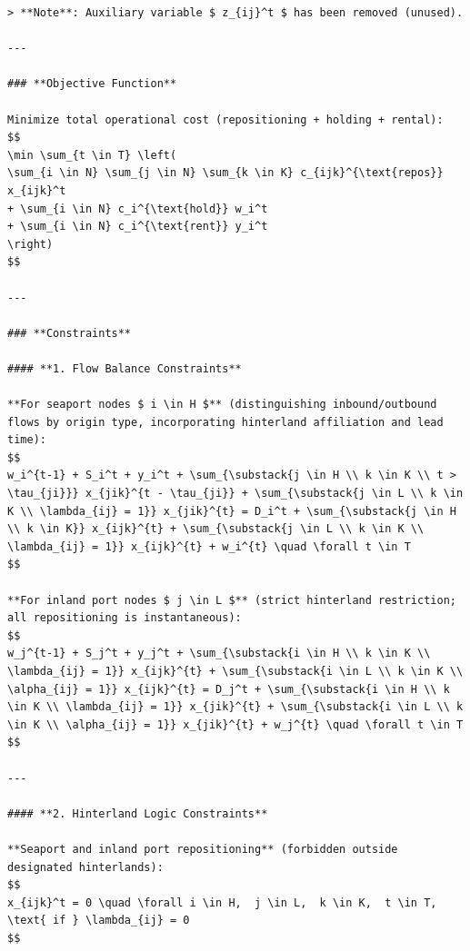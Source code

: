 \documentclass[preprint,12pt]{elsarticle}
\begin{document}
\begin{lstlisting}
> **Note**: Auxiliary variable $ z_{ij}^t $ has been removed (unused).

---

### **Objective Function**

Minimize total operational cost (repositioning + holding + rental):
$$
\min \sum_{t \in T} \left(
\sum_{i \in N} \sum_{j \in N} \sum_{k \in K} c_{ijk}^{\text{repos}} x_{ijk}^t
+ \sum_{i \in N} c_i^{\text{hold}} w_i^t
+ \sum_{i \in N} c_i^{\text{rent}} y_i^t
\right)
$$

---

### **Constraints**

#### **1. Flow Balance Constraints**

**For seaport nodes $ i \in H $** (distinguishing inbound/outbound flows by origin type, incorporating hinterland affiliation and lead time):
$$
w_i^{t-1} + S_i^t + y_i^t + \sum_{\substack{j \in H \\ k \in K \\ t > \tau_{ji}}} x_{jik}^{t - \tau_{ji}} + \sum_{\substack{j \in L \\ k \in K \\ \lambda_{ij} = 1}} x_{jik}^{t} = D_i^t + \sum_{\substack{j \in H \\ k \in K}} x_{ijk}^{t} + \sum_{\substack{j \in L \\ k \in K \\ \lambda_{ij} = 1}} x_{ijk}^{t} + w_i^{t} \quad \forall t \in T
$$

**For inland port nodes $ j \in L $** (strict hinterland restriction; all repositioning is instantaneous):
$$
w_j^{t-1} + S_j^t + y_j^t + \sum_{\substack{i \in H \\ k \in K \\ \lambda_{ij} = 1}} x_{ijk}^{t} + \sum_{\substack{i \in L \\ k \in K \\ \alpha_{ij} = 1}} x_{ijk}^{t} = D_j^t + \sum_{\substack{i \in H \\ k \in K \\ \lambda_{ij} = 1}} x_{jik}^{t} + \sum_{\substack{i \in L \\ k \in K \\ \alpha_{ij} = 1}} x_{jik}^{t} + w_j^{t} \quad \forall t \in T
$$

---

#### **2. Hinterland Logic Constraints**

**Seaport and inland port repositioning** (forbidden outside designated hinterlands):
$$
x_{ijk}^t = 0 \quad \forall i \in H,  j \in L,  k \in K,  t \in T,  \text{ if } \lambda_{ij} = 0
$$


\end{lstlisting}
\end{document}

